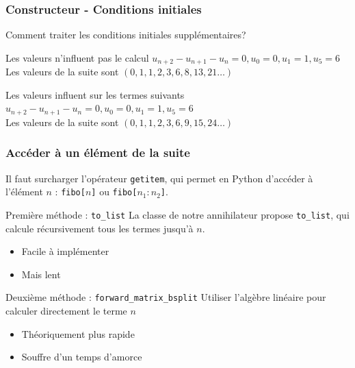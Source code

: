 \documentclass{beamer}
\newlength{\charwidth}
\newcommand{\uline}{\underline{\hspace{2\charwidth}}}
\begin{document}

\begin{frame}
\frametitle{Constructeur - Conditions initiales}
\begin{center}
{\large Comment traiter les conditions initiales supplémentaires?}
\begin{block}{Les valeurs n'influent pas le calcul}
    $u_{n+2} - u_{n+1} - u_n = 0, u_0=0, u_1=1, u_5=6$\\
    Les valeurs de la suite sont $(0,1,1,2,3,6,8,13,21\ldots)$
\end{block}
\begin{block}{Les valeurs influent sur les termes suivants}
    $u_{n+2} - u_{n+1} - u_n = 0, u_0=0, u_1=1, u_5=6$\\
    Les valeurs de la suite sont $(0,1,1,2,3,6,9,15,24\ldots)$
\end{block}
\end{center}
\end{frame}


\begin{frame}
\frametitle{Accéder à un élément de la suite}
\begin{center}
Il faut surcharger l'opérateur \texttt{\uline getitem\uline}, qui permet en Python
d'accéder à l'élément $n$ : \texttt{fibo[$n$]} ou \texttt{fibo[$n_1:n_2$]}.
\begin{block}{Première méthode : \texttt{to\_list}}
    La classe de notre annihilateur propose \texttt{to\_list}, qui calcule récursivement tous
    les termes jusqu'à $n$.
    \begin{itemize}
        \item Facile à implémenter
        \item Mais lent
    \end{itemize}
\end{block}
\begin{block}{Deuxième méthode : \texttt{forward\_matrix\_bsplit}}
    Utiliser l'algèbre linéaire pour calculer directement le terme $n$
    \begin{itemize}
        \item Théoriquement plus rapide
        \item Souffre d'un temps d'amorce
    \end{itemize}
\end{block}
\end{center}
\end{frame}
\end{document}
